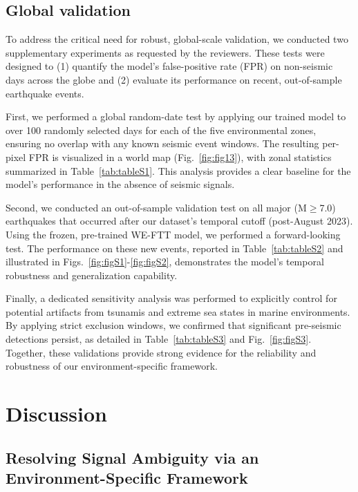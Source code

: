 \documentclass[preprint,review,12pt,authoryear]{elsarticle}
\begin{document}
\subsection{Global validation}\label{sec:global_validation}
To address the critical need for robust, global-scale validation, we conducted two supplementary experiments as requested by the reviewers. These tests were designed to (1) quantify the model's false-positive rate (FPR) on non-seismic days across the globe and (2) evaluate its performance on recent, out-of-sample earthquake events.

First, we performed a global random-date test by applying our trained model to over 100 randomly selected days for each of the five environmental zones, ensuring no overlap with any known seismic event windows. The resulting per-pixel FPR is visualized in a world map (Fig.~\ref{fig:fig13}), with zonal statistics summarized in Table~\ref{tab:tableS1}. This analysis provides a clear baseline for the model's performance in the absence of seismic signals.

Second, we conducted an out-of-sample validation test on all major (M$\ge$7.0) earthquakes that occurred after our dataset's temporal cutoff (post-August 2023). Using the frozen, pre-trained WE-FTT model, we performed a forward-looking test. The performance on these new events, reported in Table~\ref{tab:tableS2} and illustrated in Figs.~\ref{fig:figS1}-\ref{fig:figS2}, demonstrates the model's temporal robustness and generalization capability.

Finally, a dedicated sensitivity analysis was performed to explicitly control for potential artifacts from tsunamis and extreme sea states in marine environments. By applying strict exclusion windows, we confirmed that significant pre-seismic detections persist, as detailed in Table~\ref{tab:tableS3} and Fig.~\ref{fig:figS3}. Together, these validations provide strong evidence for the reliability and robustness of our environment-specific framework.

\section{Discussion}\label{sec:discussion}

\subsection{Resolving Signal Ambiguity via an Environment-Specific Framework}\label{sec:discuss_ambiguity}
\end{document}

